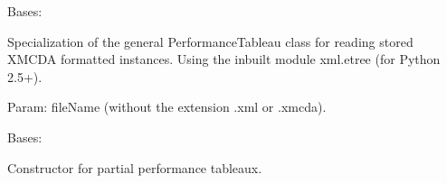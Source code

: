 \documentclass[letterpaper,10pt,english]{sphinxmanual}
\begin{document}

\begin{fulllineitems}
\label{techDoc:perfTabs.OldXMCDAPerformanceTableau}
Bases: {\hyperref[techDoc:perfTabs.PerformanceTableau]{}}

Specialization of the general PerformanceTableau class for reading
stored XMCDA formatted instances. Using the inbuilt module
xml.etree (for Python 2.5+).

Param: fileName (without the extension .xml or .xmcda).

\end{fulllineitems}


\begin{fulllineitems}
\label{techDoc:perfTabs.PartialPerformanceTableau}
Bases: {\hyperref[techDoc:perfTabs.PerformanceTableau]{}}

Constructor for partial performance tableaux.

\end{fulllineitems}

\end{document}
